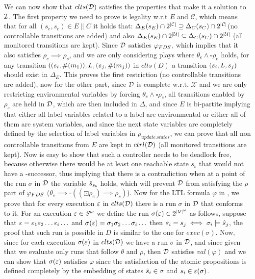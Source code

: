 We can now show that $clts(\mathcal{D})$ satisfies the properties that make it a solution to $\mathcal{I}$. The first property we need to prove is legality w.r.t $E$ and $\mathcal{C}$, which means that for all $(s_e,s_c) \in E \parallel C$ it holds that:
$\Delta_{E}(s_E)\cap 2^{|\mathcal{C}|} \supseteq \Delta_{C}(s_C)\cap 2^{|\mathcal{C}|}$(no controllable transitions are added) and also $\Delta_{E}(s_E)\cap 2^{|\mathcal{U}|} \subseteq \Delta_{C}(s_C)\cap 2^{|\mathcal{U}|}$ (all monitored transitions are kept). Since $\mathcal{D}$ satisfies $\varphi_{FDS}$, which implies that it also satisfies $\rho_e \implies \rho_s$, and we are only considering plays where $\theta_e \wedge \square \rho_e$ holds, for any transition $((s_i, \#(m_1)),L,(s_j,\#(m_j))$ in $clts(D)$ a transition $(s_i, L, s_j)$ should exist in $\Delta_E$. This proves the first restriction (no controllable transitions are added), now for the other part, since $\mathcal{D}$ is complete w.r.t. $\mathcal{X}$ and we are only restricting environmental variables by forcing $\theta_e \wedge \square\rho_e$, all transitions enabled by $\rho_e$ are held in $\mathcal{D}$, which are then included in $\Delta$, and since $E$ is bi-partite implying that either all label variables related to a label are environmental or either all of them are system variables, and since the next state variables are completely defined by the selection of label variables in $\rho_{update.states}$, we can prove that all non controllable transitions from $E$ are kept in $ctrl(\mathcal{D})$ (all monitored transitions are kept). Now is easy to show that such a controller needs to be deadlock free, because otherwise there would be at least one reachable state $s_b$ that would not have a \fdsD-successor, thus implying that there is a contradiction when at a point of the run $\sigma$ in $\mathcal{D}$ the variable $\hat{s}_{s_b}$ holds, which will prevent $\mathcal{D}$ from satisfying the $\rho$ part of $\varphi_{FDS}$ ($\theta_e \implies \square((\boxdot \rho_e) \implies \rho_s)$).  
Now for the LTL formula $\varphi$ in \controlProblem, we prove that for every execution $\varepsilon$ in $clts(\mathcal{D})$ there is a run $\sigma$ in $\mathcal{D}$ that conforms to it.
For an execution $\varepsilon \in S^{\omega}$ we define the run $\sigma(\varepsilon) \in 2^{|\mathcal{V}|^{\omega}}$ as follows, suppose that $\varepsilon= \varepsilon_1 \varepsilon_2 \ldots \varepsilon_i \ldots$ and $\sigma(\varepsilon) = \sigma_1 \sigma_2 \ldots \sigma_i \ldots$ 
 then $\varepsilon_i = s_j \iff \sigma_i \models \hat{s}_{j}$, the proof that such run is possible in $D$ is similar to the one for $exec(\sigma)$.
Now, since for each execution $\sigma(\varepsilon)$ in $clts(\mathcal{D})$ we have a run $\sigma$ in $\mathcal{D}$, and since given that we evaluate only runs that follow $\theta$ and $\rho$, then $\mathcal{D}$ satisfies $val(\varphi)$ and we can show that $\sigma(\varepsilon)$ satisfies $\varphi$ since the satisfaction of the atomic propositions is defined completely by the embedding of states $\hat{s}_{i} \in \sigma$ and $s_i \in \varepsilon(\sigma)$.